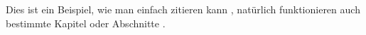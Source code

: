 	Dies ist ein Beispiel, wie man einfach zitieren kann 
	\citep{smith2009}, natürlich funktionieren auch bestimmte Kapitel oder Abschnitte \citep[Kapitel 1]{smith2010}.
	
	




	\printbibliography[heading=bibintoc]
	
	
	
	\pagestyle{plain}
	
	


	
		





